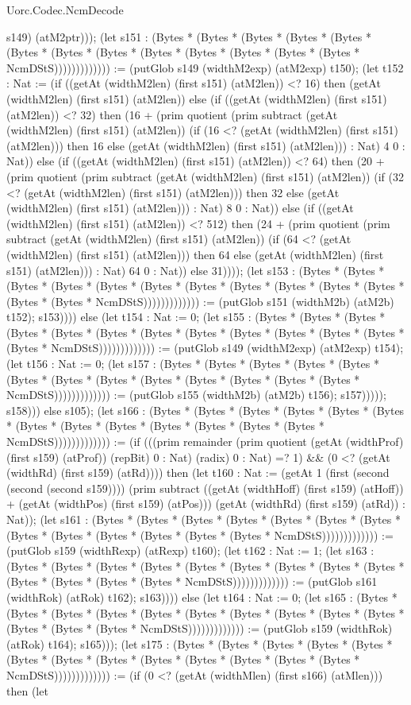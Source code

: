 \begin{lexlean}{Uorc.Codec.NcmDecode}
\begin{semanticmodule}
{s149) (atM2ptr))); (let s151 : (Bytes * (Bytes * (Bytes * (Bytes * (Bytes * (Bytes * (Bytes * (Bytes * (Bytes * (Bytes * (Bytes * (Bytes * (Bytes * NcmDStS))))))))))))) := (putGlob s149 (widthM2exp) (atM2exp) t150); (let t152 : Nat := (if ((getAt (widthM2len) (first s151) (atM2len)) <? 16) then (getAt (widthM2len) (first s151) (atM2len)) else (if ((getAt (widthM2len) (first s151) (atM2len)) <? 32) then (16 + (prim quotient (prim subtract (getAt (widthM2len) (first s151) (atM2len)) (if (16 <? (getAt (widthM2len) (first s151) (atM2len))) then 16 else (getAt (widthM2len) (first s151) (atM2len))) : Nat) 4 0 : Nat)) else (if ((getAt (widthM2len) (first s151) (atM2len)) <? 64) then (20 + (prim quotient (prim subtract (getAt (widthM2len) (first s151) (atM2len)) (if (32 <? (getAt (widthM2len) (first s151) (atM2len))) then 32 else (getAt (widthM2len) (first s151) (atM2len))) : Nat) 8 0 : Nat)) else (if ((getAt (widthM2len) (first s151) (atM2len)) <? 512) then (24 + (prim quotient (prim subtract (getAt (widthM2len) (first s151) (atM2len)) (if (64 <? (getAt (widthM2len) (first s151) (atM2len))) then 64 else (getAt (widthM2len) (first s151) (atM2len))) : Nat) 64 0 : Nat)) else 31)))); (let s153 : (Bytes * (Bytes * (Bytes * (Bytes * (Bytes * (Bytes * (Bytes * (Bytes * (Bytes * (Bytes * (Bytes * (Bytes * (Bytes * NcmDStS))))))))))))) := (putGlob s151 (widthM2b) (atM2b) t152); s153)))) else (let t154 : Nat := 0; (let s155 : (Bytes * (Bytes * (Bytes * (Bytes * (Bytes * (Bytes * (Bytes * (Bytes * (Bytes * (Bytes * (Bytes * (Bytes * (Bytes * NcmDStS))))))))))))) := (putGlob s149 (widthM2exp) (atM2exp) t154); (let t156 : Nat := 0; (let s157 : (Bytes * (Bytes * (Bytes * (Bytes * (Bytes * (Bytes * (Bytes * (Bytes * (Bytes * (Bytes * (Bytes * (Bytes * (Bytes * NcmDStS))))))))))))) := (putGlob s155 (widthM2b) (atM2b) t156); s157))))); s158))) else s105); (let s166 : (Bytes * (Bytes * (Bytes * (Bytes * (Bytes * (Bytes * (Bytes * (Bytes * (Bytes * (Bytes * (Bytes * (Bytes * (Bytes * NcmDStS))))))))))))) := (if (((prim remainder (prim quotient (getAt (widthProf) (first s159) (atProf)) (repBit) 0 : Nat) (radix) 0 : Nat) =? 1) && (0 <? (getAt (widthRd) (first s159) (atRd)))) then (let t160 : Nat := (getAt 1 (first (second (second (second s159)))) (prim subtract ((getAt (widthHoff) (first s159) (atHoff)) + (getAt (widthPos) (first s159) (atPos))) (getAt (widthRd) (first s159) (atRd)) : Nat)); (let s161 : (Bytes * (Bytes * (Bytes * (Bytes * (Bytes * (Bytes * (Bytes * (Bytes * (Bytes * (Bytes * (Bytes * (Bytes * (Bytes * NcmDStS))))))))))))) := (putGlob s159 (widthRexp) (atRexp) t160); (let t162 : Nat := 1; (let s163 : (Bytes * (Bytes * (Bytes * (Bytes * (Bytes * (Bytes * (Bytes * (Bytes * (Bytes * (Bytes * (Bytes * (Bytes * (Bytes * NcmDStS))))))))))))) := (putGlob s161 (widthRok) (atRok) t162); s163)))) else (let t164 : Nat := 0; (let s165 : (Bytes * (Bytes * (Bytes * (Bytes * (Bytes * (Bytes * (Bytes * (Bytes * (Bytes * (Bytes * (Bytes * (Bytes * (Bytes * NcmDStS))))))))))))) := (putGlob s159 (widthRok) (atRok) t164); s165))); (let s175 : (Bytes * (Bytes * (Bytes * (Bytes * (Bytes * (Bytes * (Bytes * (Bytes * (Bytes * (Bytes * (Bytes * (Bytes * (Bytes * NcmDStS))))))))))))) := (if (0 <? (getAt (widthMlen) (first s166) (atMlen))) then (let }
\end{semanticmodule}
\end{lexlean}
